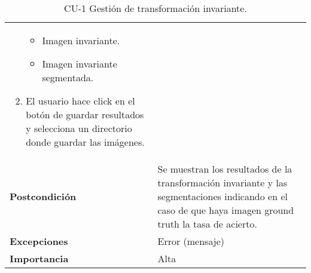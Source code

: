 \begin{table}[p]
\begin{tabularx}{\linewidth}{ p{} p{} }
\begin{enumerate}
\begin{itemize}
                \item Imagen invariante.
                \item Imagen invariante segmentada.
            \end{itemize}
            \item El usuario hace click en el botón de guardar resultados y selecciona un directorio donde guardar las imágenes.
		\end{enumerate}\\
		\textbf{Postcondición}        & Se muestran los resultados de la transformación invariante y las segmentaciones indicando en el caso de que haya imagen ground truth la tasa de acierto.\\
		\textbf{Excepciones}          & Error (mensaje) \\
		\textbf{Importancia}          & Alta \\
		\bottomrule
	\end{tabularx}
	\caption{CU-1 Gestión de transformación invariante.}
\end{table}


